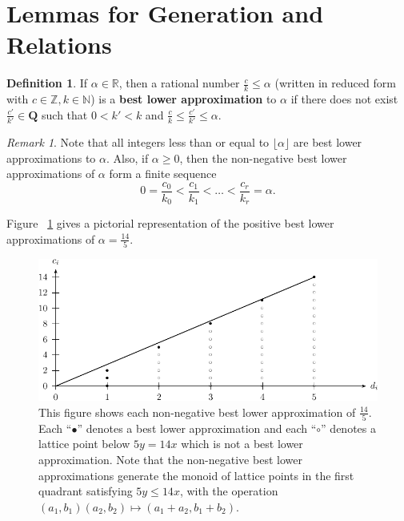 \documentclass{amsart}
\theoremstyle{plain}
\theoremstyle{definition}
\newtheorem{defn}[thm]{Definition}
\theoremstyle{remark}
\newtheorem{rem}[thm]{Remark}
\numberwithin{equation}{section}
\newcommand\bn{{\mathbb N}}
\newcommand\br{{\mathbb R}}
\newcommand\bz{{\mathbb Z}}
\begin{document}

\section{Lemmas for Generation and Relations}
\label{sec:lemmas}

\begin{defn}
\label{defn:lower-approximation}
If $\alpha \in \br$, then a rational number $\frac{c}{k} \leq \alpha$
(written in reduced form with $c \in \bz, k \in \bn$) is a
\textbf{best lower approximation} to $\alpha$ if there does not
exist $\frac{c'}{k'}\in \mathbf{Q}$ such that $0 < k'< k$ and
$\frac{c}{k} \le \frac{c'}{k'} \le \alpha$. 
\end{defn}

\begin{rem}
\label{rem:lower-approximation}
Note that all integers less than or equal to $\lfloor \alpha \rfloor$
are best lower approximations to $\alpha$. Also, if $\alpha \ge 0$,
then the non-negative best lower approximations of
$\alpha$ form a finite sequence
\[
	0 = \frac{c_0}{k_0} < \frac{c_1}{k_1} < \ldots < \frac{c_r}{k_r} = \alpha.
\]

\noindent
Figure ~\ref{fig:s14/5-lattice} gives a pictorial representation of the positive best lower approximations of $\alpha = \frac{14}{5}$.
\end{rem}

\begin{figure}
\includegraphics{pics/spin-lower-approximations-pic-pics.pdf}
\caption{This figure shows each non-negative best lower
approximation of $\frac{14}{5}.$ Each ``$\bullet$'' denotes a best
lower approximation and each ``$\circ$'' denotes a lattice point
below $5y=14x$ which is not a best lower approximation.  Note that
the non-negative best lower approximations generate the monoid of
lattice points in the first quadrant satisfying  $5y \le 14x$, with
the operation $(a_1, b_1)(a_2, b_2)\mapsto (a_1 + a_2, b_1 + b_2)$.}
\label{fig:s14/5-lattice}
\end{figure}
\end{document}
